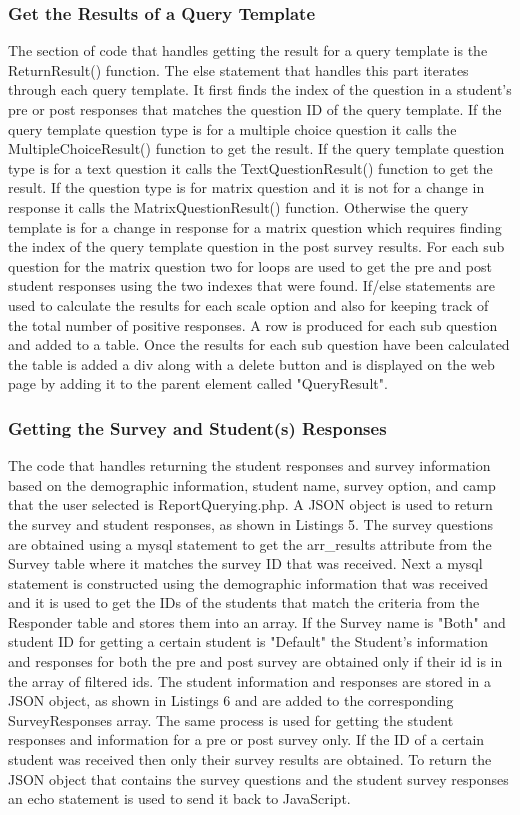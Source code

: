 \documentclass[../final.tex]{subfiles}
\begin{document}
	\subsubsection{Get the Results of a Query Template}
	The section of code that handles getting the result for a query template  is the ReturnResult() function. The else statement that handles this part iterates through each query template. It first finds the index of the question in a student's pre or post responses that matches the question ID of the query template. If the query template question type is for a multiple choice question it calls the MultipleChoiceResult() function to get the result. If the query template question type is for a text question it calls the TextQuestionResult() function to get the result. If the question type is for matrix question and it is not for a change in response it calls the MatrixQuestionResult() function. Otherwise the query template is for a change in response for a matrix question which requires finding the index of the query template question in the post survey results. For each sub question for the matrix question two for loops are used to get the pre and post student responses using the two indexes that were found. If/else statements are used to calculate the results for each scale option and also for keeping track of the total number of positive responses. A row is produced for each sub question and added to a table. Once the results for each sub question have been calculated the table is added a div along with a delete button and is displayed on the web page by adding it to the parent element called "QueryResult". 
	
	
	\subsubsection{Getting the Survey and Student(s) Responses}
	The code that handles returning the student responses and survey information based on the demographic information, student name, survey option, and camp that the user selected is ReportQuerying.php. A JSON object is used to return the survey and student responses, as shown in Listings 5. The survey questions are obtained using a mysql statement to get the arr\_results attribute from the Survey table where it matches the survey ID that was received. Next a mysql statement is constructed using the demographic information that was received and it is used to get the IDs of the students that match the criteria from the Responder table and stores them into an array. If the Survey name is "Both" and student ID for getting a certain student is "Default" the Student's information and responses for both the pre and post survey are obtained only if their id is in the array of filtered ids. The student information and responses are stored in a JSON object, as shown in Listings 6 and are added to the corresponding SurveyResponses array. The same process is used for getting the student responses and information for a pre or post survey only. If the ID of a certain student was received then only their survey results are obtained. To return the JSON object that contains the survey questions and the student survey responses an echo statement is used to send it back to JavaScript. 
	
\end{document}
